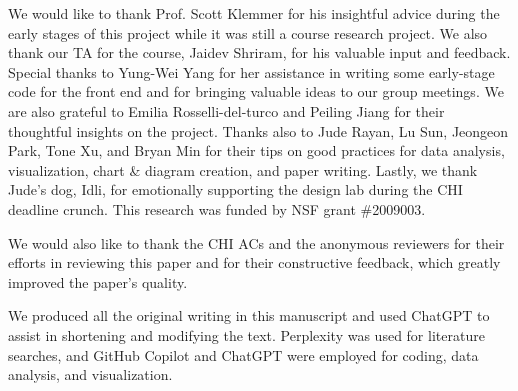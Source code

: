 \begin{acks}
We would like to thank Prof. Scott Klemmer for his insightful advice during the early stages of this project while it was still a course research project. We also thank our TA for the course, Jaidev Shriram, for his valuable input and feedback. Special thanks to Yung-Wei Yang for her assistance in writing some early-stage code for the front end and for bringing valuable ideas to our group meetings. We are also grateful to Emilia Rosselli-del-turco and Peiling Jiang for their thoughtful insights on the project. Thanks also to Jude Rayan, Lu Sun, Jeongeon Park, Tone Xu, and Bryan Min for their tips on good practices for data analysis, visualization, chart \& diagram creation, and paper writing. Lastly, we thank Jude’s dog, Idli, for emotionally supporting the design lab during the CHI deadline crunch. This research was funded by NSF grant \#2009003.

We would also like to thank the CHI ACs and the anonymous reviewers for their efforts in reviewing this paper and for their constructive feedback, which greatly improved the paper's quality.

We produced all the original writing in this manuscript and used ChatGPT to assist in shortening and modifying the text. Perplexity was used for literature searches, and GitHub Copilot and ChatGPT were employed for coding, data analysis, and visualization.
\end{acks}